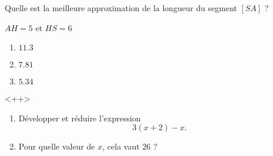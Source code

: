 


\begin{rituel}
    
    Quelle est la meilleure approximation de la longueur du segment \( [SA]\) ?

\begin{center}
    \large
    
\end{center}

\( AH=5\) et \( HS=6\)


\begin{enumerate}
    \item
        \( 11.3\)
    \item
        \( 7.81\)
    \item
        \( 5.34\)
\end{enumerate}
\end{rituel}<++>

\begin{rituel}
    
\begin{enumerate}
    \item
        Développer et réduire l'expression
        \begin{equation}
            3(x+2)-x.
        \end{equation}
    \item
        Pour quelle valeur de \( x\), cela vaut \( 26\) ?
\end{enumerate}

\end{rituel}

